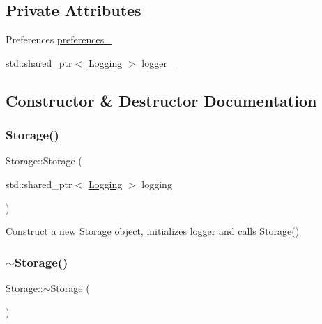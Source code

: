 \subsection*{Private Attributes}
\begin{DoxyCompactItemize}
\item 
Preferences \hyperlink{classStorage_a732ba8eb7553eb54c85f8595ff3db787}{preferences\+\_\+}
\item 
std\+::shared\+\_\+ptr$<$ \hyperlink{classLogging}{Logging} $>$ \hyperlink{classStorage_ae18c6eef49561af14d0e08988a9def40}{logger\+\_\+}
\end{DoxyCompactItemize}


\subsection{Constructor \& Destructor Documentation}
\mbox{\label{classStorage_a6b40766d93f003a117435135e6c790bb}} 
\subsubsection{\texorpdfstring{Storage()}{Storage()}}
{\footnotesize\ttfamily Storage\+::\+Storage (\begin{DoxyParamCaption}\item[{std\+::shared\+\_\+ptr$<$ \hyperlink{classLogging}{Logging} $>$}]{logging }\end{DoxyParamCaption})}



Construct a new \hyperlink{classStorage}{Storage} object, initializes logger and calls \hyperlink{classStorage_a6b40766d93f003a117435135e6c790bb}{Storage()} 

\mbox{\label{classStorage_a73cf30f0a34250396f9eabee7dc5c93d}} 
\subsubsection{\texorpdfstring{$\sim$\+Storage()}{~Storage()}}
{\footnotesize\ttfamily Storage\+::$\sim$\+Storage (\begin{DoxyParamCaption}{ }\end{DoxyParamCaption})}



